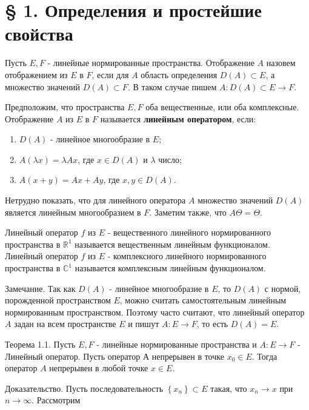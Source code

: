 


\section*{§ 1. Определения и простейшие свойства}
Пусть $E, F$ - линейные нормированные пространства. Отображение $A$ назовем отображением из $E$ в $F$, если для $A$ область определения $D(A) \subset E$, а множество значений $D(A) \subset F$. В таком случае пишем $A: D(A) \subset E \rightarrow F$.

Предположим, что пространства $E, F$ оба вещественные, или оба комплексные. Отображение $A$ из $E$ в $F$ называется \textbf{линейным оператором}, если:

\begin{enumerate}
	\item $D(A)$ - линейное многообразие в $E$;

	\item $A(\lambda x)=\lambda A x$, где $x \in D(A)$ и $\lambda$ число;

	\item $A(x+y)=A x+A y$, где $x, y \in D(A)$.

\end{enumerate}

Нетрудно показать, что для линейного оператора $A$ множество значений $D(A)$ является линейным многообразием в $F$. Заметим также, что $A \Theta=\Theta$.

Линейный оператор $f$ из $E$ - вещественного линейного нормированного пространства в $\mathbb{R}^{1}$ называется вещественным линейным функционалом. Линейный оператор $f$ из $E$ - комплексного линейного нормированного пространства в $\mathbb{C}^{1}$ называется комплексным линейным функционалом.

Замечание. Так как $D(A)$ - линейное многообразие в $E$, то $D(A)$ с нормой, порожденной пространством $E$, можно считать самостоятельным линейным нормированным пространством. Поэтому часто считают, что линейный оператор $A$ задан на всем пространстве $E$ и пишут $A: E \rightarrow F$, то есть $D(A)=E$.

Теорема 1.1. Пусть $E, F$ - линейные нормированные пространства и $A: E \rightarrow F$ - Линейный оператор. Пусть оператор А непрерывен в точке $x_{0} \in E$. Тогда оператор $A$ непрерывен в любой точке $x \in E$.

Доказательство. Пусть последовательность $\left\{x_{n}\right\} \subset E$ такая, что $x_{n} \rightarrow x$ при $n \rightarrow \infty$. Рассмотрим

